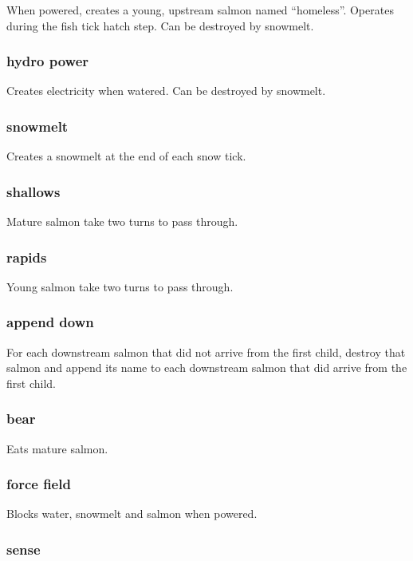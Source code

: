 \documentclass[10pt]{article}
\begin{document}
When powered, creates a young, upstream salmon named ``homeless''. Operates during the
fish tick hatch step. Can be destroyed by snowmelt.

\subsubsection{hydro power}

Creates electricity when watered. Can be destroyed by snowmelt.

\subsubsection{snowmelt}

Creates a snowmelt at the end of each snow tick.

\subsubsection{shallows}

Mature salmon take two turns to pass through.

\subsubsection{rapids}

Young salmon take two turns to pass through.

\subsubsection{append down}

For each downstream salmon that did not arrive from the first child, destroy that salmon and append its name
to each downstream salmon that did arrive from the first child.

\subsubsection{bear}

Eats mature salmon.

\subsubsection{force field}

Blocks water, snowmelt and salmon when powered.

\subsubsection{sense}
\end{document}
